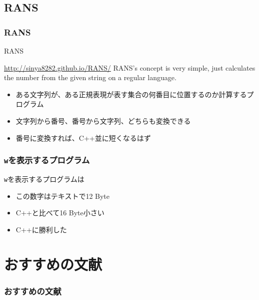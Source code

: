 \documentclass[12pt, unicode, svgnames]{beamer}
\begin{document}
\subsection{RANS}
\begin{frame}[fragile]
  \frametitle{RANS}

  \begin{block}{RANS}
    \begin{shadequote}[r]{\scriptsize\url{http://sinya8282.github.io/RANS/}}
      RANS's concept is very simple, just calculates the number from the given string on a regular language.
    \end{shadequote}
  \end{block}

  \begin{itemize}
    \item<2-> ある文字列が、ある正規表現が表す集合の何番目に位置するのか計算するプログラム
    \item<3-> 文字列から番号、番号から文字列、どちらも変換できる
    \item<4-> 番号に変換すれば、C++並に短くなるはず
  \end{itemize}
\end{frame}

\begin{frame}[fragile]
  \frametitle{\texttt{w}を表示するプログラム}

  \texttt{w}を表示するプログラムは

  \begin{itemize}
    \item<3-> この数字はテキストで12 Byte
    \item<4-> C++と比べて16 Byte小さい
    \item<5-> C++に勝利した
  \end{itemize}
\end{frame}

\begin{frame}
  \tableofcontents
\end{frame}

\section{おすすめの文献}
\begin{frame}
  \frametitle{おすすめの文献}

  \nocite{*}
  
  
\end{frame}
\end{document}
